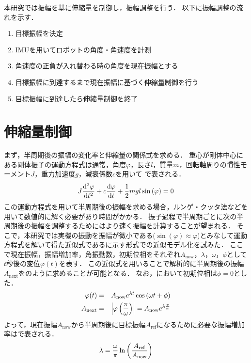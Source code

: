           本研究では振幅を基に伸縮量を制御し，振幅調整を行う．
          以下に振幅調整の流れを示す．
          \begin{enumerate}
            \item 目標振幅を決定
            \item IMUを用いてロボットの角度・角速度を計測
            \item 角速度の正負が入れ替わる時の角度を現在振幅とする
            \item 目標振幅に到達するまで現在振幅に基づく伸縮量制御を行う
            \item 目標振幅に到達したら伸縮量制御を終了
          \end{enumerate}

          \section{伸縮量制御}

          まず，半周期後の振幅の変化率と伸縮量の関係式を求める．
          重心が剛体中心にある剛体振子の運動方程式は通常，角度$\varphi$，長さ$l$，質量$m$，回転軸周りの慣性モーメント$J$，重力加速度$g$，減衰係数$c$を用いて
          で表される．
          \begin{eqnarray}
            \equlabel{equation}
            J \frac{\mathrm{d}^2 \varphi}{\mathrm{d} t^2} +c \frac{\mathrm{d}\varphi}{\mathrm{d} t}+\frac{1}{2}mgl \sin{(\varphi)}=0
          \end{eqnarray}
          この運動方程式を用いて半周期後の振幅を求める場合，ルンゲ・クッタ法などを用いて数値的に解く必要があり時間がかかる．
          振子過程で半周期ごとに次の半周期後の振幅を調整するためにはより速く振幅を計算することが望まれる．
          そこで，本研究では実機の振動を振幅が微小である($\sin{(\varphi)}\approx \varphi$)とみなして運動方程式を解いて得た近似式であるに示す形式での近似モデル化を試みた．
          ここで現在振幅，振幅増加率，角振動数，初期位相をそれぞれ$A_{\mathrm{now}}$，$\lambda$，$\omega$，$\phi$として
          $t$秒後の変位$\varphi(t)$を表す．
          この近似式を用いることで解析的に半周期後の振幅$A_{\mathrm{next}}$をのように求めることが可能となる．
          なお，において初期位相は$\phi = 0$とした．
          \begin{eqnarray}
            \equlabel{Approximation Model}
            \varphi(t)&=&A_{\mathrm{now}}e^{\lambda t}\cos{(\omega t + \phi)}\\
            \equlabel{amp rate}
            A_{\mathrm{next}}&=&\left|\varphi\left(\frac{\pi}{\omega}\right)\right|=A_{\mathrm{now}}e^{\lambda \frac{\pi}{\omega}}
          \end{eqnarray}
          よって，現在振幅$A_{\mathrm{now}}$から半周期後に目標振幅$A_{\mathrm{ref}}$になるために必要な振幅増加率はで表される．
          \begin{eqnarray}
            \equlabel{lambda}
            \lambda=\frac{\omega}{\pi}\ln{\left(\frac{A_{\mathrm{ref}}}{A_{\mathrm{now}}}\right)}
          \end{eqnarray}

